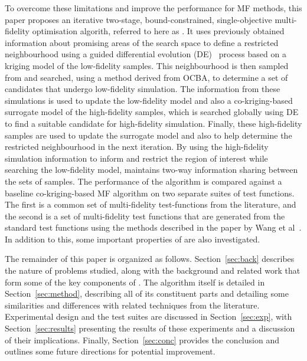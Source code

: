 To overcome these limitations and improve the performance for MF methods, this paper proposes an iterative two-stage, bound-constrained, single-objective multi-fidelity optimisation algorith, referred to here as \AlgName{}. It uses previously obtained information about promising areas of the search space to define a restricted neighbourhood using a guided differential evolution (DE)~\cite{storn1997differential} process based on a kriging model of the low-fidelity samples. This neighbourhood is then sampled from and searched, using a method derived from OCBA, to determine a set of candidates that undergo low-fidelity simulation. The information from these simulations is used to update the low-fidelity model and also a co-kriging-based surrogate model of the high-fidelity samples, which is searched globally using DE to find a suitable candidate for high-fidelity simulation. Finally, these high-fidelity samples are used to update the surrogate model and also to help determine the restricted neighbourhood in the next iteration. By using the high-fidelity simulation information to inform and restrict the region of interest while searching the low-fidelity model, \AlgName{} maintains two-way information sharing between the sets of samples. The performance of the \AlgName{} algorithm is compared against a baseline co-kriging-based MF algorithm on two separate suites of test functions. The first is a common set of multi-fidelity test-functions from the literature, and the second is a set of multi-fidelity test functions that are generated from the standard test functions using the methods described in the paper by Wang et al~\cite{wang2017generic}. In addition to this, some important properties of \AlgName{} are also investigated.

The remainder of this paper is organized as follows. Section~\ref{sec:back} describes the nature of problems studied, along with the background and related work that form some of the key components of \AlgName{}. The algorithm itself is detailed in Section~\ref{sec:method}, describing all of its constituent parts and detailing some similarities and differences with related techniques from the literature. Experimental design and the test suites are discussed in Section~\ref{sec:exp}, with Section~\ref{sec:results} presenting the results of these experiments and a discussion of their implications. Finally, Section~\ref{sec:conc} provides the conclusion and outlines some future directions for potential improvement.
